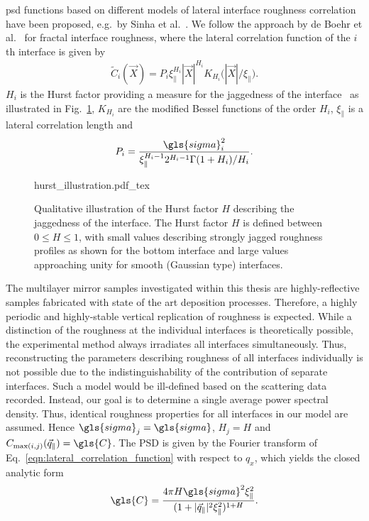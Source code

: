 \Gls{psd} functions based on different models of lateral interface roughness correlation have been proposed, e.g.~by Sinha et al.~\cite{sinha_x-ray_1988}. We follow the approach by de Boehr et al.~\cite{de_boer_influence_1994,de_boer_x-ray_1995} for fractal interface roughness, where the lateral correlation function of the $i$th interface is given by
\begin{align}
\tilde{C}_i(\vec{X}) = P_i \xi_\parallel^{H_i} |\vec{X}|^{H_i} K_{H_i}\Big(|\vec{X}|/\xi_\parallel\Big) \text{.} \label{eqn:lateral_correlation_function}
\end{align}
$H_i$ is the Hurst factor providing a measure for the jaggedness of the interface~\cite{sinha_x-ray_1988} as illustrated in Fig.~\ref{ch_theo:fig_hurst_illustration}, $K_{H_i}$ are the modified Bessel functions of the order $H_i$, $\xi_\parallel$ is a lateral correlation length and
\begin{align}
P_i = \frac{\gls{sigma}_i^2}{\xi_\parallel^{H_i-1} 2^{H_i-1} \Gamma(1+H_i)/H_i}\text{.}
\end{align}
\begin{figure}[tb]
    \def\svgwidth{0.5\textwidth}
    {hurst_illustration.pdf_tex}
    \caption[Qualitative illustration of the Hurst factor.]{Qualitative illustration of the Hurst factor $H$ describing the jaggedness of the interface. The Hurst factor $H$ is defined between $0 \leq H \leq 1$, with small values describing strongly jagged roughness profiles as shown for the bottom interface and large values approaching unity for smooth (Gaussian type) interfaces.}
    \label{ch_theo:fig_hurst_illustration}
\end{figure}

The multilayer mirror samples investigated within this thesis are highly-reflective samples fabricated with state of the art deposition processes. Therefore, a highly periodic and highly-stable vertical replication of roughness is expected. While a distinction of the roughness at the individual interfaces is theoretically possible, the experimental method always irradiates all interfaces simultaneously. Thus, reconstructing the parameters describing roughness of all interfaces individually is not possible due to the indistinguishability of the contribution of separate interfaces. Such a model would be ill-defined based on the scattering data recorded. Instead, our goal is to determine a single average power spectral density. Thus, identical roughness properties for all interfaces in our model are assumed. Hence $\gls{sigma}_j = \gls{sigma}$, $H_j = H$ and $C_{\text{max}(i,j)}(\vec{q}_\parallel) = \gls{C}$. The PSD is given by the Fourier transform of Eq.~\eqref{eqn:lateral_correlation_function} with respect to $q_x$, which yields the closed analytic form
\begin{equation}
        \gls{C} = \frac{4 \pi H \gls{sigma}^2 \xi_\parallel^2}{(1+|\vec{q}_\parallel|^2\xi_\parallel^2)^{1+H}} \text{.} \label{ch_theo:eqn_psd} 
\end{equation}

